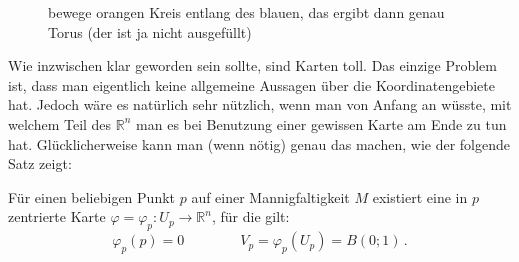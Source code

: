 \documentclass[../H_Analysis_main.tex]{subfiles}
\begin{document}
\begin{figure}[ht]
\centering
{}\hspace*{0.04\textwidth}

\caption[Torus]{bewege orangen Kreis entlang des blauen, das ergibt dann genau Torus (der ist ja nicht ausgefüllt)}
\label{fig:torus}
\end{figure}



Wie inzwischen klar geworden sein sollte, sind Karten toll. Das einzige Problem ist, dass man eigentlich keine allgemeine Aussagen über die Koordinatengebiete hat. Jedoch wäre es natürlich sehr nützlich, wenn man von Anfang an wüsste, mit welchem Teil des $\mathbb{R}^n$ man es bei Benutzung einer gewissen Karte am Ende zu tun hat. Glücklicherweise kann man (wenn nötig) genau das machen, wie der folgende Satz zeigt:

\begin{satz}
Für einen beliebigen Punkt $p$ auf einer Mannigfaltigkeit $M$ existiert eine in $p$ zentrierte Karte $\varphi = \varphi_p: U_p \rightarrow \mathbb{R}^n$, für die gilt:
\begin{equation}
\varphi_p(p) = 0 \qquad \qquad V_p = \varphi_p(U_p) = B(0; 1) \, .
\end{equation}
\end{satz}

\end{document}
